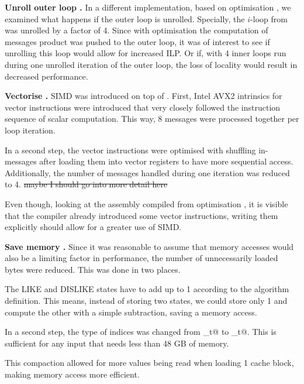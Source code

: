 \documentclass[final,letterpaper]{article}
\let\cref=\Cref %
\newcommand{\mypar}[1]{{\bf #1.}}
\begin{document}
\mypar{Unroll outer loop }
In a different implementation, based on optimisation , we examined what happens if the outer loop is unrolled. Specially, the $i$-loop from \cref{algo:propagate} was unrolled by a factor of 4. Since with optimisation  the computation of messages product was pushed to the outer loop, it was of interest to see if unrolling this loop would allow for increased ILP. Or if, with 4 inner loops run during one unrolled iteration of the outer loop, the loss of locality would result in decreased performance.

\mypar{Vectorise }
SIMD was introduced on top of . First, Intel AVX2 intrinsics for vector instructions were introduced that very closely followed the instruction sequence of scalar computation. This way, 8 messages were processed together per loop iteration.

In a second step, the vector instructions were optimised with shuffling in-messages after loading them into vector registers to have more sequential access. Additionally, the number of messages handled during one iteration was reduced to 4. \st{maybe I should go into more detail here}
 
Even though, looking at the assembly compiled from optimisation , it is visible that the compiler already introduced some vector instructions, writing them explicitly should allow for a greater use of SIMD. 



\mypar{Save memory }
Since it was reasonable to assume that memory accesses would also be a limiting factor in performance, the number of unnecessarily loaded bytes were reduced. This was done in two places.

The LIKE and DISLIKE states have to add up to 1 according to the algorithm definition. This means, instead of storing two states, we could store only 1 and compute the other with a simple subtraction, saving a memory access.

In a second step, the type of indices was changed from \verb@size_t@ to _t@. This is sufficient for any input that needs less than 48 GB of memory. 


This compaction allowed for more values being read when loading 1 cache block, making memory access more efficient.
\end{document}
